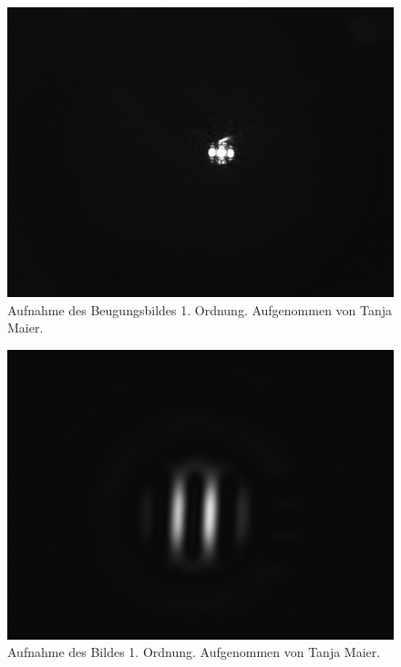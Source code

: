 \documentclass{article}
\begin{document}
\begin{minipage}[t]{.45\textwidth}
\begin{figure}[H]
\includegraphics[scale=0.1]{tm/Beugungsbild_1.jpg}
\caption{Aufnahme des Beugungsbildes 1. Ordnung. Aufgenommen von Tanja Maier.}
\label{fig:bbild_1_tm}
\end{figure}
\end{minipage}
\hfill
\noindent
\begin{minipage}[t]{.45\textwidth}
\begin{figure}[H]
\includegraphics[scale=0.1]{tm/Bild_1.jpg}
\caption{Aufnahme des Bildes 1. Ordnung. Aufgenommen von Tanja Maier.}\label{fig:bild_1_tm}
\end{figure}
\end{minipage}
\end{document}

